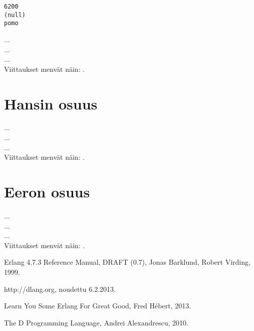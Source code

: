 \documentclass[11pt,oneside,a4paper]{article}
\begin{document}
\begin{verbatim}
6200
(null)
pomo
\end{verbatim}


... \\
... \\
... \\

Viittaukset menvät näin: \cite{ALE10}.

\section{Hansin osuus}
... \\
... \\
... \\

Viittaukset menvät näin: \cite{ERL99}.

\section{Eeron osuus}
... \\
... \\
... \\

Viittaukset menvät näin: \cite{HEB13}.




\begin{thebibliography}{99}

 Erlang 4.7.3 Reference Manual, DRAFT (0.7), Jonas
Barklund, Robert Virding, 1999. 

 http://dlang.org, noudettu 6.2.2013.

 Learn You Some Erlang For Great Good, Fred Hébert, 2013.

 The D Programming Language, Andrei Alexandrescu, 2010.

\end{thebibliography}
\end{document}

